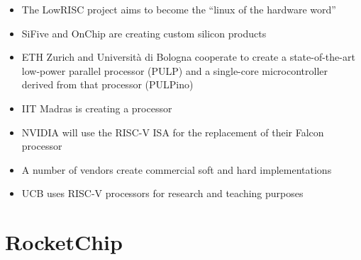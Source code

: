 \documentclass[journal,a4paper]{IEEEtran}
\begin{document}

\begin{itemize}
	\item The LowRISC project aims to become the ``linux of the hardware word''\cite{lowrisc}
	\item SiFive\cite{sifive} and OnChip are creating custom silicon products\cite{open-v}
	\item ETH Zurich and Università di Bologna cooperate to create a state-of-the-art low-power parallel processor (PULP) and a single-core microcontroller derived from that processor (PULPino)\cite{pulp}
	\item IIT Madras is creating a processor\cite{iid-madras}
	\item NVIDIA will use the RISC-V ISA for the replacement of their Falcon processor\cite{nvidia}
	\item A number of vendors create commercial soft and hard implementations\cite{riscv-commercial} %
	\item UCB uses RISC-V processors for research\cite{ucb-science} and teaching purposes\cite{sodor}
\end{itemize}

\section{RocketChip}
\end{document}
